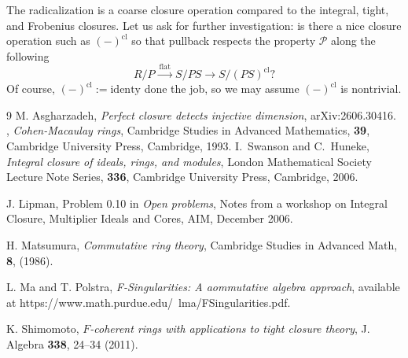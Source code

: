 \documentclass[10pt,a4paper]{amsart}
\theoremstyle{definition}
\theoremstyle{remark}
\begin{document}
The radicalization is a coarse closure operation compared to the integral, tight, and Frobenius closures. Let us ask for further investigation: is there a nice closure operation such as \((-)^{\mathrm{cl}}\) so that pullback respects the property \(\mathcal{P}\) along the following
\[
R/P \xrightarrow{\ \mathrm{flat}\ } S/PS \longrightarrow S/(PS)^{\mathrm{cl}}?
\]
Of course, $(-)^{\mathrm{cl}}:=\mathrm{identy}$ done the job, so we may assume 
$(-)^{\mathrm{cl}}$ is nontrivial.
\begin{thebibliography}{9}
M. Asgharzadeh, {\it Perfect closure detects injective dimension}, arXiv:2606.30416.	
, {\it Cohen-Macaulay rings},  Cambridge Studies in Advanced Mathematics,
{\bf 39},
Cambridge University Press, Cambridge, 1993.
 {I.~Swanson} and {C.~Huneke}, \emph{Integral closure of ideals, rings, and
	modules}, London Mathematical Society Lecture Note Series, {\bf
	336}, Cambridge University Press, Cambridge, 2006.



 J. Lipman, Problem 0.10 in \emph{Open problems}, Notes from a workshop
on Integral Closure, Multiplier Ideals and Cores, AIM, December 2006.

H. Matsumura, \emph{Commutative ring theory}, Cambridge Studies in Advanced Math, \textbf{8}, (1986).



 L. Ma and T. Polstra, 	\emph{F-Singularities: A aommutative algebra approach},   available at https://www.math.purdue.edu/~lma/FSingularities.pdf.

	

K. Shimomoto,
\emph{$F$-coherent rings with applications to tight closure theory},
J. Algebra {\bf338}, 24--34 (2011).










\end{thebibliography}
\end{document}
